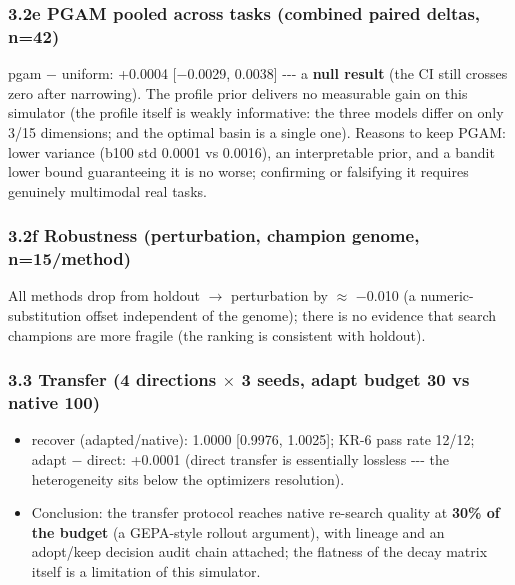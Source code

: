 \subsubsection{3.2e PGAM pooled across tasks (combined paired deltas, n=42)}\label{32e-pgam-pooled-across-tasks-combined-paired-deltas-n42}

pgam \(-\) uniform: +0.0004 {[}\(-\)0.0029, 0.0038{]} -\/-\/- a \textbf{null result} (the CI still crosses zero after narrowing). The profile prior delivers no measurable gain on this simulator (the profile itself is weakly informative: the three models differ on only 3/15 dimensions; and the optimal basin is a single one). Reasons to keep PGAM: lower variance (b100 std 0.0001 vs 0.0016), an interpretable prior, and a bandit lower bound guaranteeing it is no worse; confirming or falsifying it requires genuinely multimodal real tasks.

\subsubsection{3.2f Robustness (perturbation, champion genome, n=15/method)}\label{32f-robustness-perturbation-champion-genome-n15method}

All methods drop from holdout \(\rightarrow\) perturbation by \(\approx\) \(-\)0.010 (a numeric-substitution offset independent of the genome); there is no evidence that search champions are more fragile (the ranking is consistent with holdout).

\subsubsection{\texorpdfstring{3.3 Transfer (4 directions \(\times\) 3 seeds, adapt budget 30 vs native 100)}{3.3 Transfer (4 directions \textbackslash times 3 seeds, adapt budget 30 vs native 100)}}\label{33-transfer-4-directions-times-3-seeds-adapt-budget-30-vs-native-100}

\begin{itemize}
\tightlist
\item
  recover (adapted/native): 1.0000 {[}0.9976, 1.0025{]}; KR-6 pass rate 12/12; adapt \(-\) direct: +0.0001 (direct transfer is essentially lossless -\/-\/- the heterogeneity sits below the optimizer\textquotesingle s resolution).
\item
  Conclusion: the transfer protocol reaches native re-search quality at \textbf{30\% of the budget} (a GEPA-style rollout argument), with lineage and an adopt/keep decision audit chain attached; the flatness of the decay matrix itself is a limitation of this simulator.
\end{itemize}

